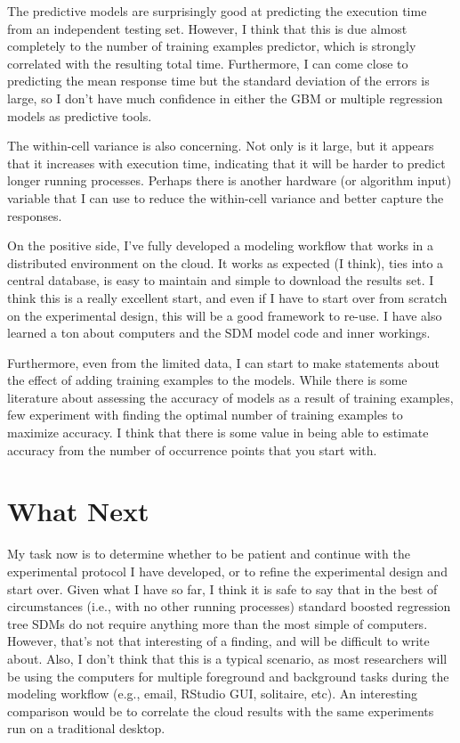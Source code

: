 \documentclass[a4paper]{article}
\begin{document}
The predictive models are surprisingly good at predicting the execution time from an independent testing set. However, I think that this is due almost completely to the number of training examples predictor, which is strongly correlated with the resulting total time.  Furthermore, I can come close to predicting the mean response time but the standard deviation of the errors is large, so I don't have much confidence in either the GBM or multiple regression models as predictive tools. 

The within-cell variance is also concerning.  Not only is it large, but it appears that it increases with execution time, indicating that it will be harder to predict longer running processes.  Perhaps there is another hardware (or algorithm input) variable that I can use to reduce the within-cell variance and better capture the responses.  

On the positive side, I've fully developed a modeling workflow that works in a distributed environment on the cloud.  It works as expected (I think), ties into a central database, is easy to maintain and simple to download the results set.   I think this is a really excellent start, and even if I have to start over from scratch on the experimental design, this will be a good framework to re-use.  I have also learned a ton about computers and the SDM model code and inner workings.  

Furthermore, even from the limited data, I can start to make statements about the effect of adding training examples to the models.  While there is some literature about assessing the accuracy of models as a result of training examples, few experiment with finding the optimal number of training examples to maximize accuracy.  I think that there is some value in being able to estimate accuracy from the number of occurrence points that you start with.

\section{What Next}
My task now is to determine whether to be patient and continue with the experimental protocol I have developed, or to refine the experimental design and start over.  Given what I have so far, I think it is safe to say that in the best of circumstances (i.e., with no other running processes) standard boosted regression tree SDMs do not require anything more than the most simple of computers.  However, that's not that interesting of a finding, and will be difficult to write about.  Also, I don't think that this is a typical scenario, as most researchers will be using the computers for multiple foreground and background tasks during the modeling workflow (e.g., email, RStudio GUI, solitaire, etc). An interesting comparison would be to correlate the cloud results with the same experiments run on a traditional desktop.
\end{document}
